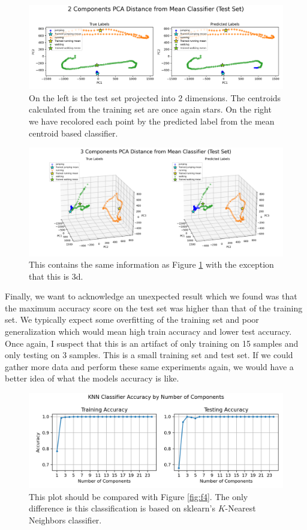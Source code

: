 \documentclass[11pt]{amsart}
\begin{document}
\begin{figure}[h]
	\centering
	\includegraphics[width=.75\textwidth]{../visualizations/pca_distance_from_mean_classifier_2d_test_set.png}
 	\caption{On the left is the test set projected into 2 dimensions.
	The centroids calculated from the training set are once again stars.
	On the right we have recolored each point by the predicted label from the mean centroid based classifier.}\label{fig:f5}
\end{figure}

\begin{figure}[h]
	\centering
	\includegraphics[width=.75\textwidth]{../visualizations/pca_distance_from_mean_classifier_3d_test_set.png}
 	\caption{This contains the same information as Figure \ref{fig:f5} with the exception that this is 3d.}\label{fig:f6}
\end{figure}

Finally, we want to acknowledge an unexpected result which we found was that the maximum accuracy score on the test set was higher than that of the training set.
We typically expect some overfitting of the training set and poor generalization which would mean high train accuracy and lower test accuracy.
Once again, I suspect that this is an artifact of only training on 15 samples and only testing on 3 samples.
This is a small training set and test set.
If we could gather more data and perform these same experiments again, we would have a better idea of what the models accuracy is like.

\begin{figure}[h]
	\centering
	\includegraphics[width=.75\textwidth]{../visualizations/train_and_test_accuracy_by_num_components_knn.png}
 	\caption{This plot should be compared with Figure \ref{fig:f4}. The only difference is this classification is based on sklearn's $K$-Nearest Neighbors classifier.}\label{fig:f7}
\end{figure}
\end{document}
